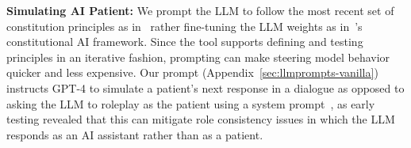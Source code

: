 \documentclass[11pt]{article}
\newcommand{\raj}[1]{\ifthenelse{\boolean{showcomments}}{\textcolor{purple}{[#1 —raj]}}{}}
\begin{document}
\textbf{Simulating AI Patient:} We prompt the LLM to follow the most recent set of constitution principles as in~\citet{petridis2023constitutionmaker} rather fine-tuning the LLM weights as in~\citet{bai2022constitutional}'s constitutional AI framework. Since the tool supports defining and testing principles in an iterative fashion, prompting can make steering model behavior quicker and less expensive. 
Our prompt (Appendix~\ref{sec:llmprompts-vanilla}) instructs GPT-4 to simulate a patient's next response in a dialogue as opposed to asking the LLM to roleplay as the patient using a system prompt~\cite{zhou2024real}, as early testing revealed that this can mitigate role consistency issues in which the LLM responds as an AI assistant rather than as a patient. 


\fi
\end{document}
